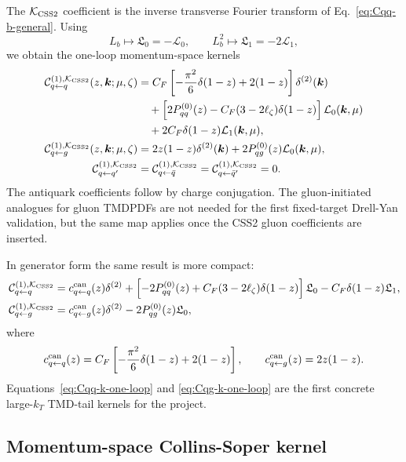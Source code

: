 \documentclass[11pt]{article}
\newcommand{\bk}{\bm{k}}
\newcommand{\deltaT}{\delta^{(2)}}
\newcommand{\KCSS}{\mathcal K_{\rm CSS2}}
\begin{document}
The $\KCSS$ coefficient is the inverse transverse Fourier transform of
Eq.~\eqref{eq:Cqq-b-general}. Using
\begin{equation}
  L_b\mapsto \mathfrak L_0=-\mathcal L_0,
  \qquad
  L_b^2\mapsto \mathfrak L_1=-2\mathcal L_1,
  \label{eq:Lb-map-one-loop}
\end{equation}
we obtain the one-loop momentum-space kernels
\begin{align}
  \mathcal C_{q\leftarrow q}^{(1),\KCSS}(z,\bk;\mu,\zeta)
  &=
  C_F\left[-\frac{\pi^2}{6}\delta(1-z)+2(1-z)\right]\deltaT(\bk)
  \\
  &\quad
  +\left[2P_{qq}^{(0)}(z)-C_F(3-2\ell_\zeta)\delta(1-z)\right]
  \mathcal L_0(\bk,\mu)
  \\
  &\quad
  +2C_F\delta(1-z)\mathcal L_1(\bk,\mu),
  \label{eq:Cqq-k-one-loop}\\
  \mathcal C_{q\leftarrow g}^{(1),\KCSS}(z,\bk;\mu,\zeta)
  &=
  2z(1-z)\deltaT(\bk)
  +2P_{qg}^{(0)}(z)\mathcal L_0(\bk,\mu),
  \label{eq:Cqg-k-one-loop}\\
  \mathcal C_{q\leftarrow q'}^{(1),\KCSS}
  &=\mathcal C_{q\leftarrow \bar q}^{(1),\KCSS}
  =\mathcal C_{q\leftarrow \bar q'}^{(1),\KCSS}=0.
  \label{eq:Cother-k-one-loop}
\end{align}
The antiquark coefficients follow by charge conjugation. The gluon-initiated analogues for
gluon TMDPDFs are not needed for the first fixed-target Drell-Yan validation, but the same
map applies once the CSS2 gluon coefficients are inserted.

In generator form the same result is more compact:
\begin{align}
  \mathcal C_{q\leftarrow q}^{(1),\KCSS}
  &=
  c_{q\leftarrow q}^{\rm can}(z)\deltaT
  +\left[-2P_{qq}^{(0)}(z)+C_F(3-2\ell_\zeta)\delta(1-z)\right]\mathfrak L_0
  -C_F\delta(1-z)\mathfrak L_1,
  \label{eq:Cqq-frak-one-loop}\\
  \mathcal C_{q\leftarrow g}^{(1),\KCSS}
  &=
  c_{q\leftarrow g}^{\rm can}(z)\deltaT
  -2P_{qg}^{(0)}(z)\mathfrak L_0,
  \label{eq:Cqg-frak-one-loop}
\end{align}
where
\begin{equation}
  c_{q\leftarrow q}^{\rm can}(z)
  =C_F\left[-\frac{\pi^2}{6}\delta(1-z)+2(1-z)\right],
  \qquad
  c_{q\leftarrow g}^{\rm can}(z)=2z(1-z).
\end{equation}
Equations~\eqref{eq:Cqq-k-one-loop} and \eqref{eq:Cqg-k-one-loop} are the first concrete
large-$k_T$ TMD-tail kernels for the project.

\subsection{Momentum-space Collins-Soper kernel}
\end{document}
